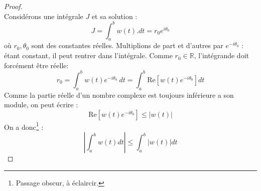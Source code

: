     \begin{proof}\ \\
    Considérons une intégrale $J$ et sa solution :
    \begin{equation}
    J = \int_a^b w(t).dt = r_0e^{i\theta_0}
    \end{equation}
    où $r_0, \theta_0$ sont des constantes réelles. Multiplions de part et d'autres par 
    $e^{-i\theta_0}$ : étant constant, il peut rentrer dans l'intégrale. Comme $r_0 \in
    \mathbb{R}$, l'intégrande doit forcément être réelle:
    \begin{equation}
    r_0 = \int_a^b w(t)e^{-i\theta_0}\ dt = \int_a^b \text{Re}[w(t)e^{-i\theta_0}]dt
    \end{equation}
    Comme la partie réelle d'un nombre complexe est toujours inférieure a son module, 
    on peut écrire :
    \begin{equation}
    \text{Re}[w(t)e^{-i\theta_0}] \leq |w(t)|
    \end{equation}
    On a donc\footnote{Passage obscur, à éclaircir.} :
    \begin{equation}
    \left|\int_a^b w(t) dt\right| \leq \int_a^b |w(t)|dt
    \end{equation}
    \end{proof}
